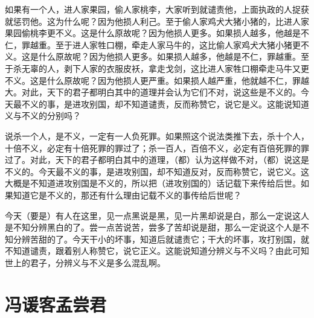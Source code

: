 \documentclass[12pt,UTF-8,openany]{ctexbook}
\begin{document}
\begin{normalsize}
    
    如果有一个人，进人家果园，偷人家桃李，大家听到就谴责他，上面执政的人捉获就惩罚他。这为什么呢？因为他损人利己。至于偷人家鸡犬大猪小猪的，比进人家果园偷桃李更不义。这是什么原故呢？因为他损人更多。如果损人越多，他越是不仁，罪越重。至于进人家牲口棚，牵走人家马牛的，这比偷人家鸡犬大猪小猪更不义。这是什么原故呢？因为他损人更多。如果损人越多，他越是不仁，罪越重。至于杀无辜的人，剥下人家的衣服皮袄，拿走戈剑，这比进人家牲口棚牵走马牛又更不义。这是什么原故呢？因为他损人更严重。如果损人越严重，他就越不仁，罪越大。对此，天下的君子都明白其中的道理并会认为它们不对，说这些是不义的。今天最不义的事，是进攻别国，却不知道谴责，反而称赞它，说它是义。这能说知道义与不义的分别吗？
    
    说杀一个人，是不义，一定有一人负死罪。如果照这个说法类推下去，杀十个人，十倍不义，必定有十倍死罪的罪过了；杀一百人，百倍不义，必定有百倍死罪的罪过了。对此，天下的君子都明白其中的道理，（都）认为这样做不对，（都）说这是不义的。今天最不义的事，是进攻别国，却不知道反对，反而称赞它，说它义。这大概是不知道进攻别国是不义的，所以把（进攻别国的）话记载下来传给后世。如果知道它是不义的，那还有什么理由记载不义的事传给后世呢？
    
    今天（要是）有人在这里，见一点黑说是黑，见一片黑却说是白，那么一定说这人是不知分辨黑白的了。尝一点苦说苦，尝多了苦却说是甜，那么一定说这个人是不知分辨苦甜的了。今天干小的坏事，知道后就谴责它；干大的坏事，攻打别国，就不知道谴责，跟着别人称赞它，说它正义。这能说知道分辨义与不义吗？由此可知世上的君子，分辨义与不义是多么混乱啊。
    
\end{normalsize}



\chapter{冯谖客孟尝君}
\end{document}
